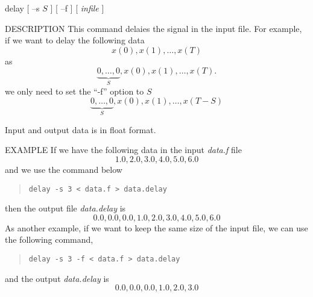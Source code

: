 
\begin{synopsis}
\item [delay] [ --s $S$ ] [ --f ] [ {\em infile} ] 
\end{synopsis}

\begin{qsection}{DESCRIPTION}
 This command delaies the signal in the input file.
 For example, if we want to delay the following data
\[ x(0), x(1), \ldots , x(T) \]
as
\[ \underbrace{0, \ldots , 0}_{S}, x(0), x(1), \ldots , x(T). \]
we only need to set the ``-f'' option to $S$
\[ \underbrace{0, \ldots , 0}_{S}, x(0), x(1), \ldots , x(T-S) \]
\par
Input and output data is in float format.
\end{qsection}

\begin{options}
\end{options}

\begin{qsection}{EXAMPLE}
If we have the following data in the input {\em data.f} file
\begin{displaymath}
 1.0, 2.0, 3.0, 4.0, 5.0, 6.0
\end{displaymath}
and we use the command below
\begin{quote}
 \verb!delay -s 3 < data.f > data.delay!
\end{quote}
then the output file {\em data.delay} is 
\begin{displaymath}
 0.0, 0.0, 0.0, 1.0, 2.0, 3.0, 4.0, 5.0, 6.0
\end{displaymath}
As another example, if we want to keep the same size of the input file,
we can use the following command,
\begin{quote}
\verb!delay -s 3 -f < data.f > data.delay!
\end{quote}
and the output {\em data.delay} is
\begin{displaymath}
 0.0, 0.0, 0.0, 1.0, 2.0, 3.0
\end{displaymath}
\end{qsection}

